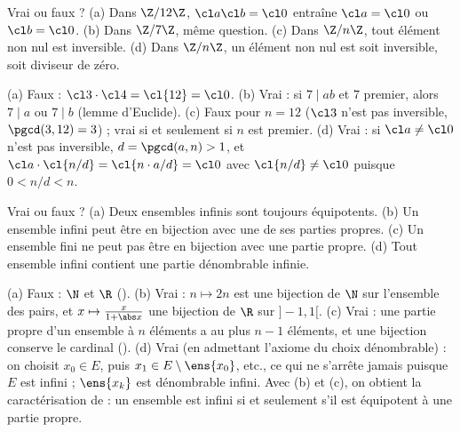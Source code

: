 \begin{exo}
Vrai ou faux ? (a) Dans $\Z/12\Z$, $\cl a\cl b=\cl0$ entraîne $\cl a=\cl0$ ou $\cl b=\cl0$. (b) Dans $\Z/7\Z$, même question. (c) Dans $\Z/n\Z$, tout élément non nul est inversible. (d) Dans $\Z/n\Z$, un élément non nul est soit inversible, soit diviseur de zéro.
\begin{corrige}
(a) Faux : $\cl3\cdot\cl4=\cl{12}=\cl0$. (b) Vrai : si $7\mid ab$ et $7$ premier, alors $7\mid a$ ou $7\mid b$ (lemme d'Euclide). (c) Faux pour $n=12$ ($\cl3$ n'est pas inversible, $\pgcd(3,12)=3$) ; vrai si et seulement si $n$ est premier. (d) Vrai : si $\cl a\neq\cl0$ n'est pas inversible, $d=\pgcd(a,n)>1$, et $\cl a\cdot\cl{n/d}=\cl{n\cdot a/d}=\cl0$ avec $\cl{n/d}\neq\cl0$ puisque $0<n/d<n$.
\end{corrige}
\end{exo}
\begin{exo}
Vrai ou faux ? (a) Deux ensembles infinis sont toujours équipotents. (b) Un ensemble infini peut être en bijection avec une de ses parties propres. (c) Un ensemble fini ne peut pas être en bijection avec une partie propre. (d) Tout ensemble infini contient une partie dénombrable infinie.
\begin{corrige}
(a) Faux : $\N$ et $\R$ (). (b) Vrai : $n\mapsto 2n$ est une bijection de $\N$ sur l'ensemble des pairs, et $x\mapsto\frac{x}{1+\abs x}$ une bijection de $\R$ sur $]-1,1[$. (c) Vrai : une partie propre d'un ensemble à $n$ éléments a au plus $n-1$ éléments, et une bijection conserve le cardinal (). (d) Vrai (en admettant l'axiome du choix dénombrable) : on choisit $x_0\in E$, puis $x_1\in E\setminus\ens{x_0}$, etc., ce qui ne s'arrête jamais puisque $E$ est infini ; $\ens{x_k}$ est dénombrable infini. Avec (b) et (c), on obtient la caractérisation de  : un ensemble est infini si et seulement s'il est équipotent à une partie propre.
\end{corrige}
\end{exo}

